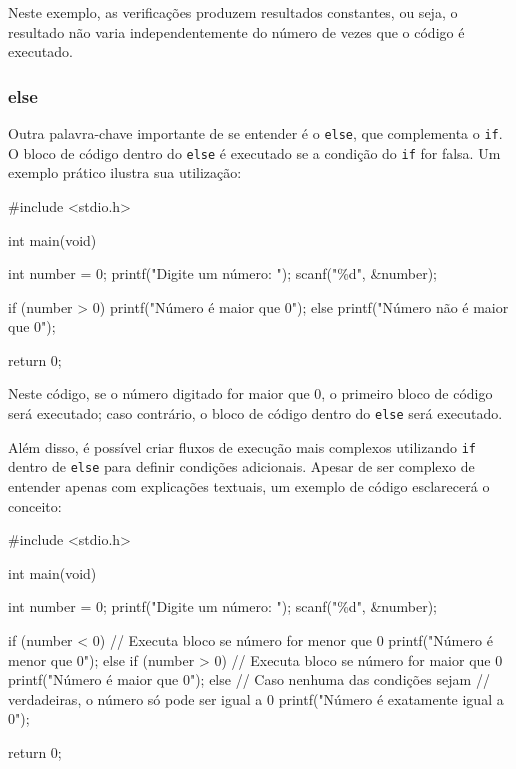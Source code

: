 Neste exemplo, as verificações produzem resultados constantes, ou seja, o 
resultado não varia independentemente do número de vezes que o código é 
executado.

\subsubsection{else}

Outra palavra-chave importante de se entender é o \texttt{else}, que complementa o 
\texttt{if}. O bloco de código dentro do \texttt{else} é executado se a 
condição do \texttt{if} for falsa. Um exemplo prático ilustra sua utilização:

\begin{excode}
    #include <stdio.h>

    int main(void)
    {
        int number = 0;
        printf("Digite um número: ");
        scanf("\%d", &number);

        if (number > 0) {
            printf("Número é maior que 0\n");
        } else {
            printf("Número não é maior que 0\n");
        }
        
        return 0;
    }
\end{excode}

Neste código, se o número digitado for maior que \(0\), o primeiro bloco de 
código será executado; caso contrário, o bloco de código dentro do 
\texttt{else} será executado.

Além disso, é possível criar fluxos de execução mais complexos utilizando 
\texttt{if} dentro de \texttt{else} para definir condições adicionais. 
Apesar de ser complexo de entender apenas com explicações textuais, um 
exemplo de código esclarecerá o conceito:

\begin{excode}
    #include <stdio.h>

    int main(void)
    {
        int number = 0;
        printf("Digite um número: ");
        scanf("\%d", &number);

        if (number < 0) {
            // Executa bloco se número for menor que 0
            printf("Número é menor que 0\n");
        } else if (number > 0) {
            // Executa bloco se número for maior que 0
            printf("Número é maior que 0\n");
        } else {
            // Caso nenhuma das condições sejam
            // verdadeiras, o número só pode ser igual a 0
            printf("Número é exatamente igual a 0\n");
        }
        
        return 0;
    }
\end{excode}

